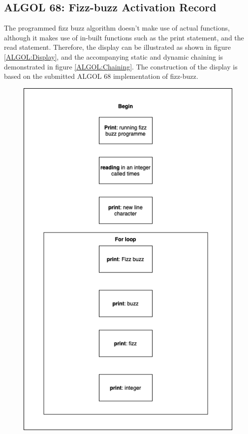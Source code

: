 \documentclass[
	12pt, %
]{fphw}
\begin{document}
\subsection{ALGOL 68: Fizz-buzz Activation Record}
The programmed fizz buzz algorithm doesn't make use of actual functions, although
it makes use of in-built functions such as the print statement, and the read
statement. Therefore, the display can be illustrated as shown in figure \ref{ALGOL:Display},
and the accompanying static and dynamic chaining is demonstrated in figure \ref{ALGOL:Chaining}.
The construction of the display is based on the submitted ALGOL 68 implementation
of fizz-buzz.
\begin{figure}[!htb]
  \centering
  \begin{minipage}[b]{0.45\textwidth}
    \includegraphics[width=\textwidth]{figures/algoDisplay.png}

\end{minipage}
\end{figure}
\end{document}
